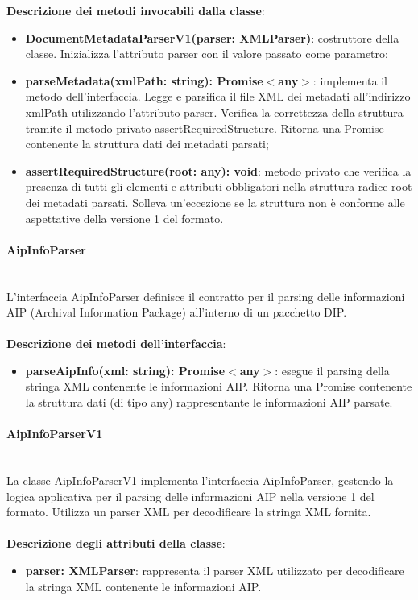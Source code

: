 \documentclass[a4paper,12pt]{article}
\begin{document}
{{{                \noindent \textbf{Descrizione dei metodi invocabili dalla classe}:
                \begin{itemize}
                    \item \textbf{DocumentMetadataParserV1(parser: XMLParser)}: costruttore della classe. Inizializza l'attributo parser con il valore passato come parametro;
                    \item \textbf{parseMetadata(xmlPath: string): Promise$<$any$>$}: implementa il metodo dell'interfaccia. Legge e parsifica il file XML dei metadati all'indirizzo xmlPath utilizzando l'attributo parser. Verifica la correttezza della struttura tramite il metodo privato assertRequiredStructure. Ritorna una Promise contenente la struttura dati dei metadati parsati;
                    \item \textbf{assertRequiredStructure(root: any): void}: metodo privato che verifica la presenza di tutti gli elementi e attributi obbligatori nella struttura radice root dei metadati parsati. Solleva un'eccezione se la struttura non è conforme alle aspettative della versione 1 del formato.
                \end{itemize}
                \paragraph{AipInfoParser}\label{par:AipInfoParser}\mbox{}\\
                L'interfaccia AipInfoParser definisce il contratto per il parsing delle informazioni AIP (Archival Information Package) all'interno di un pacchetto DIP.\\
                \\
                \noindent \textbf{Descrizione dei metodi dell'interfaccia}:
                \begin{itemize}
                    \item \textbf{parseAipInfo(xml: string): Promise$<$any$>$}: esegue il parsing della stringa XML contenente le informazioni AIP. Ritorna una Promise contenente la struttura dati (di tipo any) rappresentante le informazioni AIP parsate.
                \end{itemize}
                \paragraph{AipInfoParserV1}\label{par:AipInfoParserV1}\mbox{}\\
                La classe AipInfoParserV1 implementa l'interfaccia AipInfoParser, gestendo la logica applicativa per il parsing delle informazioni AIP nella versione 1 del formato. Utilizza un parser XML per decodificare la stringa XML fornita.\\
                \\
                \textbf{Descrizione degli attributi della classe}:
                \begin{itemize}
                    \item \textbf{parser: XMLParser}: rappresenta il parser XML utilizzato per decodificare la stringa XML contenente le informazioni AIP.
                \end{itemize}
                
}}}
\end{document}
